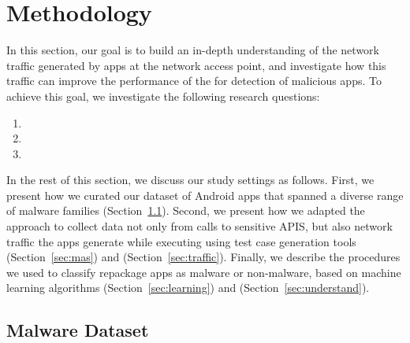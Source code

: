 \section{Methodology}\label{sec:Methodology}


In this section, our goal is to build an in-depth understanding of the network traffic generated by apps at the network access point, and investigate how this traffic can improve the performance of the \mas for detection of malicious apps. To achieve this goal, we investigate the following research questions:


\begin{enumerate}[(RQ1)]
\item \rqa
\item \rqb
\item \rqc
\end{enumerate}

In the rest of this section, we discuss our study settings as follows. First, we present how we curated our dataset of Android apps that spanned a diverse range of malware families (Section~\ref{sec:dataset}). Second, we present how we adapted the
\mas approach to collect data not only from calls to sensitive APIS, but also network traffic the apps generate while executing using test case generation tools (Section~\ref{sec:mas}) and (Section~\ref{sec:traffic}). Finally, we describe the procedures we used to classify repackage apps as malware or non-malware, based on machine learning algorithms (Section~\ref{sec:learning}) and (Section~\ref{sec:understand}).

\subsection{Malware Dataset}\label{sec:dataset}


